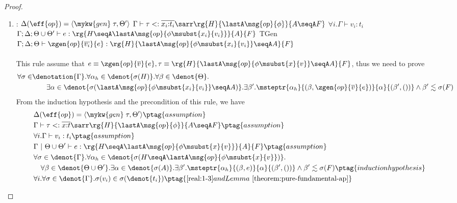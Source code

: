 \begin{proof}
\begin{enumerate}[label=Case]
\item:
{\footnotesize
\mprooftr{87mm}
{
$\Delta(\eff{op}) =\langle \mykw{gen}\;\tau, \Theta' \rangle$ \quad
$\Gamma \vdash \tau <: \overline{x_i{:}t_i}\sarr
\rg{H}{\lastA\msg{op}{\phi}}{A \seqA F}$ \quad
$\forall i. \Gamma \vdash v_i : t_i$ \quad
 $\Gamma; \Delta; \Theta \cup \Theta' \vdash e : \rg{H \seqA \lastA\msg{op}{\phi\msubst{x_i}{v_i}}}{A}{F}$
 }
{TGen}
{$\Gamma; \Delta; \Theta \vdash \zgen{op}{\overline{v_i}}{e} : \rg{H}{\lastA\msg{op}{\phi\msubst{x_i}{v_i}} \seqA A}{F}$}
\ \\ \ \\}
This rule assume that $e \equiv \zgen{op}{\overline{v}}{e}, \tau \equiv \rg{H}{\lastA\msg{op}{\phi\msubst{x}{v}} \seqA A}{F}$, thus we need to prove
{\footnotesize\begin{align*}
\forall \sigma \in
    &\denotation{\Gamma}. \forall \alpha_h \in \denot{\sigma(H)}.\forall \beta \in \denot{\Theta}. 
    \\&\qquad \exists \alpha \in \denot{\sigma(\lastA\msg{op}{\phi\msubst{x_i}{v_i}} \seqA A)}.\exists \beta'. \msteptr{\alpha_h}{(\beta, \zgen{op}{\overline{v}}{e})}{\alpha}{(\beta', ())} \land \beta' \realz \sigma(F)
\end{align*}}\noindent
From the induction hypothesis and the precondition of this rule, we have
{\footnotesize\begin{alignat}{2}
\setcounter{equation}{0}
&\Delta(\eff{op}) =\langle \mykw{gen}\;\tau, \Theta' \rangle \ptag{assumption} \label{real:1-1} \\
&\Gamma \vdash \tau <: \overline{x{:}t}\sarr \rg{H}{\lastA\msg{op}{\phi}}{A \seqA F} \ptag{assumption} \label{real:1-2} \\
&\forall i. \Gamma \vdash v_i : t_i \ptag{assumption} \label{real:1-3} \\
&\Gamma ~|~ \Theta \cup \Theta' \vdash e : \rg{H \seqA \lastA\msg{op}{\phi\msubst{x}{v}}}{A}{F} \ptag{assumption} \label{real:1-4} \\
&\forall \sigma \in \denot{\Gamma}.\forall \alpha_h \in \denot{\sigma(H \seqA \lastA\msg{op}{\phi\msubst{x}{v}})}. \notag
\\&\quad \forall \beta \in \denot{\Theta \cup \Theta'}.\exists \alpha \in\denot{\sigma(A)}. \exists \beta'. \msteptr{\alpha_h}{(\beta, e)}{\alpha}{(\beta', ())} \land \beta' \realz \sigma(F)
\ptag{induction hypothesis} \label{real:1-5} \\
&\forall i. \forall \sigma \in \denot{\Gamma}. \sigma(v_i) \in  \sigma(\denot{t_i}) \ptag{\ref{real:1-3} and Lemma~\ref{theorem:pure-fundamental-ap}} \label{real:1-6} \\

\end{alignat}}
\end{enumerate}
\end{proof}
